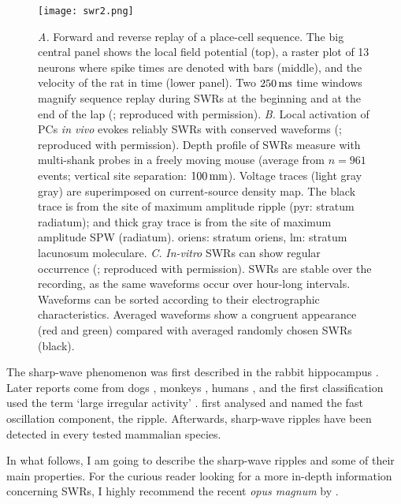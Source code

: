     \begin{figure}
      \center
      \texttt{[image: swr2.png]}
      \caption{
        {\it A.} Forward and reverse replay of a place-cell sequence. The big central
        panel shows the local field potential (top), a raster plot of 13
        neurons where spike times are denoted with bars (middle), and the
        velocity of the rat in time (lower panel). Two $250\, \rm ms$ time windows magnify sequence
        replay during SWRs at the beginning and at the end of the
        lap (\citealp{Diba2007}; reproduced with permission).
        {\it B.} Local activation of PCs \textit{in vivo} evokes reliably SWRs
        with conserved waveforms (\citealp{Stark2014}; reproduced with
        permission). Depth profile of SWRs measure with multi-shank probes in a
        freely moving mouse (average from $n = 961$ events; vertical site
        separation: $100\,\rm mm$). Voltage traces (light gray gray) are
        superimposed on current-source density map. The black trace is from the
        site of maximum amplitude ripple (pyr: stratum radiatum); and thick
        gray trace is from the site of maximum amplitude SPW (radiatum).
        oriens: stratum oriens, lm: stratum lacunosum moleculare.
        {\it C.} \textit{In-vitro} SWRs can show regular occurrence
        (\citealp{Reichinnek2010}; reproduced with permission). SWRs are
        stable over the recording, as the same waveforms occur over hour-long
        intervals. Waveforms can be sorted according to their electrographic
        characteristics. Averaged waveforms show a congruent
        appearance (red and green) compared with averaged randomly chosen SWRs (black).
             }
    \label{fig:swr}
    \end{figure}

  The sharp-wave phenomenon was first described in the rabbit hippocampus
  \citep{Stumpf1965}. Later reports come from dogs \citep{Yoshii1966}, monkeys
  \citep{Freemon1969}, humans \citep{Freemon1970}, and the first classification
  used the term `large irregular activity' \citep{Vanderwolf1969}.
  \cite{Buzsaki1992} first analysed and named the fast oscillation component,
  the ripple. Afterwards, sharp-wave ripples have been detected in every tested
  mammalian species. 

  In what follows, I am going to describe the sharp-wave ripples and some of
  their main properties. For the curious reader looking for a more in-depth
  information concerning SWRs, I highly recommend the recent \textit{opus
  magnum} by \cite{Buzsaki2015}.

